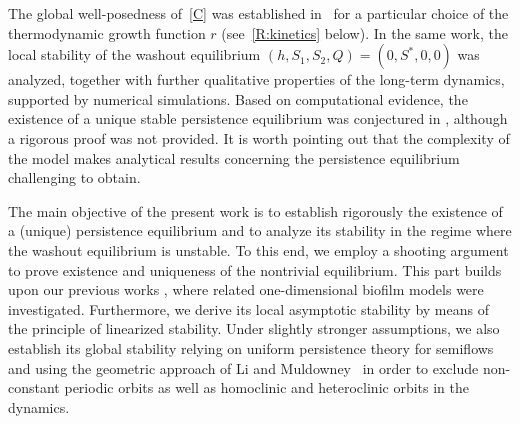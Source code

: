 \documentclass[reqno,11pt]{amsart}
\numberwithin{equation}{section}
\begin{document}
The global well-posedness of~\eqref{C} was established in~\cite{GHE21} for a particular choice of the thermodynamic growth function $r$ (see~\eqref{R:kinetics} below). In the same work, the local stability of the washout equilibrium $(h,S_1,S_2,Q)=(0,S^*,0,0)$ was analyzed, together with further qualitative properties of the long-term dynamics, supported by numerical simulations. Based on computational evidence, the existence of a unique stable persistence equilibrium was conjectured in \cite[Conjecture 1]{GHE21}, although a rigorous proof was not provided. It is worth pointing out that the complexity of the model makes analytical results concerning the persistence equilibrium challenging to obtain.

The main objective of the present work is to establish rigorously the existence of a (unique) persistence equilibrium and to analyze its stability in the regime where the washout equilibrium is unstable. To this end, we employ a shooting argument to prove existence and uniqueness of the nontrivial equilibrium. 
This part builds upon our previous works \cite{GW_QAM,NW26}, where related one-dimensional biofilm models were investigated.
 Furthermore, we  derive its local asymptotic stability by means of the principle of linearized stability. Under slightly stronger assumptions, we also establish its global stability relying on uniform persistence theory for semiflows \cite{HaleWaltman1989,SmithThieme2011} and
 using the geometric approach of  Li and Muldowney~\cite{LiMuldowney1996} in order to exclude non-constant periodic orbits  as well as homoclinic and heteroclinic orbits in the dynamics.\\
\end{document}
